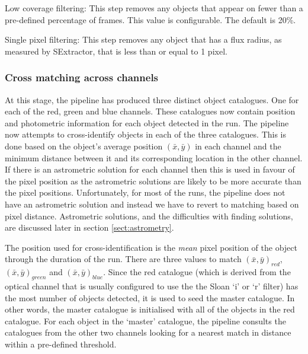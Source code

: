 Low coverage filtering: This step removes any objects that appear on fewer than a pre-defined percentage of frames. This value is configurable. The default is 20\%. 

Single pixel filtering: This step removes any object that has a flux radius, as measured by SExtractor, that is less than or equal to 1 pixel.

\subsubsection{Cross matching across channels}
At this stage, the pipeline has produced three distinct object catalogues. One for each of the red, green and blue channels. These catalogues now contain position and photometric information for each object detected in the run.  The pipeline now attempts to cross-identify objects in each of the three catalogues. This is done based on the object's average position $(\bar{x}, \bar{y})$ in each channel and the minimum distance between it and its corresponding location in the other channel. If there is an astrometric solution for each channel then this is used in favour of the pixel position as the astrometric solutions are likely to be more accurate than the pixel positions. Unfortunately, for most of the runs, the pipeline does not have an astrometric solution and instead we have to revert to matching based on pixel distance. Astrometric solutions, and the difficulties with finding solutions, are discussed later in section \ref{sect:astrometry}.

The position used for cross-identification is the \emph{mean} pixel position of the object through the duration of the run. There are three values to match $(\bar{x}, \bar{y})_{red}$, $(\bar{x}, \bar{y})_{green}$ and $(\bar{x}, \bar{y})_{blue}$. Since the red catalogue (which is derived from the optical channel that is usually configured to use the the Sloan `i' or `r' filter) has the most number of objects detected, it is used to seed the master catalogue. In other words, the master catalogue is initialised with all of the objects in the red catalogue. For each object in the `master' catalogue, the pipeline consults the catalogues from the other two channels looking for a nearest match in distance within a pre-defined threshold.

